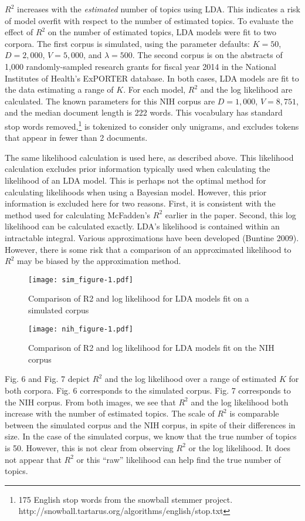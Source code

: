 \documentclass[conference,final,]{IEEEtran}
\makeatletter
\def\maxwidth{\ifdim\Gin@nat@width>\linewidth\linewidth
\else\Gin@nat@width\fi}
\let\Oldincludegraphics\includegraphics
\renewcommand{\includegraphics}[1]{\Oldincludegraphics[width=\maxwidth]{#1}}
\makeatother
\begin{document}
\(R^2\) increases with the \textit{estimated} number of topics using
LDA. This indicates a risk of model overfit with respect to the number
of estimated topics. To evaluate the effect of \(R^2\) on the number of
estimated topics, LDA models were fit to two corpora. The first corpus
is simulated, using the parameter defaults: \(K = 50\), \(D = 2{,}000\),
\(V = 5{,}000\), and \(\lambda = 500\). The second corpus is on the
abstracts of 1,000 randomly-sampled research grants for fiscal year 2014
in the National Institutes of Health's ExPORTER database. In both cases,
LDA models are fit to the data estimating a range of \(K\). For each
model, \(R^2\) and the log likelihood are calculated. The known
parameters for this NIH corpus are \(D = 1{,}000\), \(V = 8,751\), and
the median document length is 222 words. This vocabulary has standard
stop words removed,\footnote{175 English stop words from the snowball
  stemmer project.
  http://snowball.tartarus.org/algorithms/english/stop.txt} is tokenized
to consider only unigrams, and excludes tokens that appear in fewer than
2 documents.

The same likelihood calculation is used here, as described above. This
likelihood calculation excludes prior information typically used when
calculating the likelihood of an LDA model. This is perhaps not the
optimal method for calculating likelihoods when using a Bayesian model.
However, this prior information is excluded here for two reasons. First,
it is consistent with the method used for calculating McFadden's \(R^2\)
earlier in the paper. Second, this log likelihood can be calculated
exactly. LDA's likelihood is contained within an intractable integral.
Various approximations have been developed (Buntine 2009). However,
there is some risk that a comparison of an approximated likelihood to
\(R^2\) may be biased by the approximation method.

\begin{figure}
\centering
\texttt{[image: sim\_figure-1.pdf]}
\caption{Comparison of R2 and log likelihood for LDA models fit on a
simulated corpus}
\end{figure}

\begin{figure}
\centering
\texttt{[image: nih\_figure-1.pdf]}
\caption{Comparison of R2 and log likelihood for LDA models fit on the
NIH corpus}
\end{figure}

Fig. 6 and Fig. 7 depict \(R^2\) and the log likelihood over a range of
estimated \(K\) for both corpora. Fig. 6 corresponds to the simulated
corpus. Fig. 7 corresponds to the NIH corpus. From both images, we see
that \(R^2\) and the log likelihood both increase with the number of
estimated topics. The scale of \(R^2\) is comparable between the
simulated corpus and the NIH corpus, in spite of their differences in
size. In the case of the simulated corpus, we know that the true number
of topics is 50. However, this is not clear from observing \(R^2\) or
the log likelihood. It does not appear that \(R^2\) or this ``raw''
likelihood can help find the true number of topics.
\end{document}
